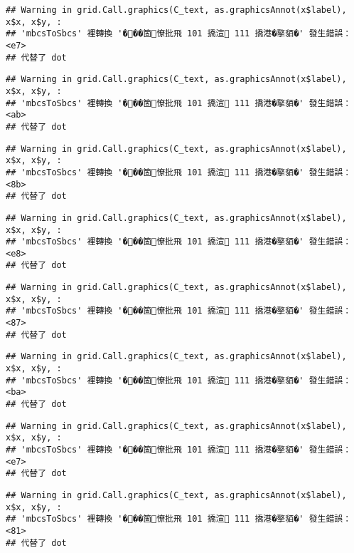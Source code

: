 \documentclass[
]{article}
\begin{document}
\begin{verbatim}
## Warning in grid.Call.graphics(C_text, as.graphicsAnnot(x$label), x$x, x$y, :
## 'mbcsToSbcs' 裡轉換 '���箇憭批飛 101 撟渲 111 撟港�摮貊�' 發生錯誤：<e7>
## 代替了 dot
\end{verbatim}

\begin{verbatim}
## Warning in grid.Call.graphics(C_text, as.graphicsAnnot(x$label), x$x, x$y, :
## 'mbcsToSbcs' 裡轉換 '���箇憭批飛 101 撟渲 111 撟港�摮貊�' 發生錯誤：<ab>
## 代替了 dot
\end{verbatim}

\begin{verbatim}
## Warning in grid.Call.graphics(C_text, as.graphicsAnnot(x$label), x$x, x$y, :
## 'mbcsToSbcs' 裡轉換 '���箇憭批飛 101 撟渲 111 撟港�摮貊�' 發生錯誤：<8b>
## 代替了 dot
\end{verbatim}

\begin{verbatim}
## Warning in grid.Call.graphics(C_text, as.graphicsAnnot(x$label), x$x, x$y, :
## 'mbcsToSbcs' 裡轉換 '���箇憭批飛 101 撟渲 111 撟港�摮貊�' 發生錯誤：<e8>
## 代替了 dot
\end{verbatim}

\begin{verbatim}
## Warning in grid.Call.graphics(C_text, as.graphicsAnnot(x$label), x$x, x$y, :
## 'mbcsToSbcs' 裡轉換 '���箇憭批飛 101 撟渲 111 撟港�摮貊�' 發生錯誤：<87>
## 代替了 dot
\end{verbatim}

\begin{verbatim}
## Warning in grid.Call.graphics(C_text, as.graphicsAnnot(x$label), x$x, x$y, :
## 'mbcsToSbcs' 裡轉換 '���箇憭批飛 101 撟渲 111 撟港�摮貊�' 發生錯誤：<ba>
## 代替了 dot
\end{verbatim}

\begin{verbatim}
## Warning in grid.Call.graphics(C_text, as.graphicsAnnot(x$label), x$x, x$y, :
## 'mbcsToSbcs' 裡轉換 '���箇憭批飛 101 撟渲 111 撟港�摮貊�' 發生錯誤：<e7>
## 代替了 dot
\end{verbatim}

\begin{verbatim}
## Warning in grid.Call.graphics(C_text, as.graphicsAnnot(x$label), x$x, x$y, :
## 'mbcsToSbcs' 裡轉換 '���箇憭批飛 101 撟渲 111 撟港�摮貊�' 發生錯誤：<81>
## 代替了 dot
\end{verbatim}
\end{document}
